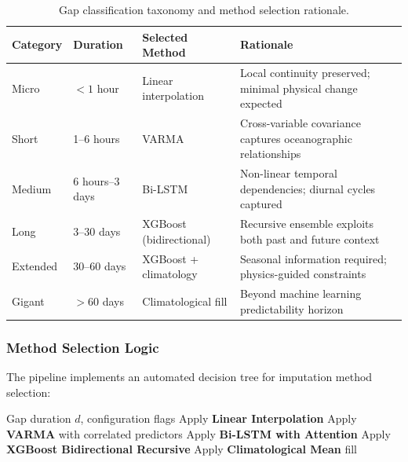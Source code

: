 \documentclass[12pt,a4paper]{article}
\begin{document}
\begin{table}[H]
\centering
\caption{Gap classification taxonomy and method selection rationale.}
\label{tab:gap_taxonomy}
\begin{tabularx}{\textwidth}{@{}llXX@{}}
\toprule
\textbf{Category} & \textbf{Duration} & \textbf{Selected Method} & \textbf{Rationale} \\ \midrule
Micro   & $< 1$ hour       & Linear interpolation  & Local continuity preserved; minimal physical change expected \\
Short   & 1--6 hours       & VARMA                 & Cross-variable covariance captures oceanographic relationships \\
Medium  & 6 hours--3 days  & Bi-LSTM               & Non-linear temporal dependencies; diurnal cycles captured \\
Long    & 3--30 days       & XGBoost (bidirectional) & Recursive ensemble exploits both past and future context \\
Extended & 30--60 days     & XGBoost + climatology & Seasonal information required; physics-guided constraints \\
Gigant  & $> 60$ days      & Climatological fill   & Beyond machine learning predictability horizon \\
\bottomrule
\end{tabularx}
\end{table}

\subsubsection{Method Selection Logic}

The pipeline implements an automated decision tree for imputation method selection:

\begin{algorithm}[H]
\caption{Automatic Method Selection Based on Gap Duration}
\begin{algorithmic}[1]
\Require Gap duration $d$, configuration flags
    \State Apply \textbf{Linear Interpolation}
    \State Apply \textbf{VARMA} with correlated predictors
    \State Apply \textbf{Bi-LSTM with Attention}
    \State Apply \textbf{XGBoost Bidirectional Recursive}
\Else
    \State Apply \textbf{Climatological Mean} fill
\EndIf
\end{algorithmic}
\end{algorithm}
\end{document}
